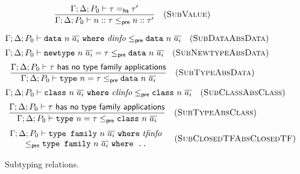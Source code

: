 \begin{figure}
\[
\frac{
\Gamma; \Delta; P_0 \vdash \tau =_\textsf{hs} \tau'
}{
\Gamma; \Delta; P_0 \vdash n :: \tau \le_\textsf{pre} n :: \tau'
}
\quad(\textsc{SubValue})
\]


\begin{mdframed}
\[
\Gamma; \Delta; P_0 \vdash \texttt{data}~n~\overline{a_i} ~\texttt{where}~ \mathit{dinfo} \le_\textsf{pre} \texttt{data}~n~\overline{a_i}
\quad(\textsc{SubDataAbsData})
\]
\[
\Gamma; \Delta; P_0 \vdash \texttt{newtype}~n~\overline{a_i} = \tau \le_\textsf{pre} \texttt{data}~n~\overline{a_i}
\quad(\textsc{SubNewtypeAbsData})
\]
\[
\frac{
\Gamma; \Delta; P_0 \vdash \tau ~\textsf{has no type family applications}
}{
\Gamma; \Delta; P_0 \vdash \texttt{type}~n = \tau \le_\textsf{pre} \texttt{data}~n~\overline{a_i}
}
\quad(\textsc{SubTypeAbsData})
\]
\[
\Gamma; \Delta; P_0 \vdash \texttt{class}~n~\overline{a_i}~\texttt{where}~ \mathit{clinfo} \le_\textsf{pre} \texttt{class}~n~\overline{a_i}
\quad(\textsc{SubClassAbsClass})
\]
\[
\frac{
\Gamma; \Delta; P_0 \vdash \tau ~\textsf{has no type family applications}
}{
\Gamma; \Delta; P_0 \vdash \texttt{type}~n = \tau \le_\textsf{pre} \texttt{class}~n~\overline{a_i}
}
\quad(\textsc{SubTypeAbsClass})
\]
\[
\begin{array}{c}
\Gamma; \Delta; P_0 \vdash \texttt{type family}~n~\overline{a_i} ~\texttt{where}~ \mathit{tfinfo} \\
\le_\textsf{pre} \texttt{type family}~n~\overline{a_i} ~\texttt{where ..}
\end{array}
\quad(\textsc{SubClosedTFAbsClosedTF})
\]
\end{mdframed}
\caption{Subtyping relations.}
\label{typing:subtyping}
\end{figure}
